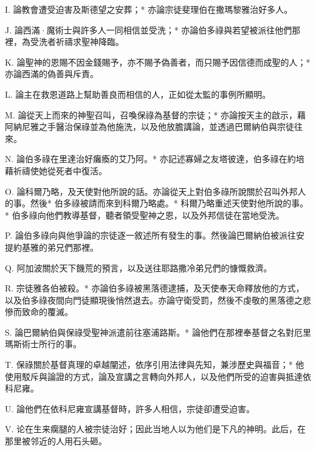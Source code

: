 I. 論教會遭受迫害及斯德望之安葬；* 亦論宗徒斐理伯在撒瑪黎雅治好多人。\par

J. 論西滿·魔術士與許多人一同相信並受洗；* 亦論伯多祿與若望被派往他們那裡，為受洗者祈禱求聖神降臨。\par

K. 論聖神的恩賜不因金錢賜予，亦不賜予偽善者，而只賜予因信德而成聖的人；* 亦論西滿的偽善與斥責。\par

L. 論主在救恩道路上幫助善良而相信的人，正如從太監的事例所顯明。\par

M. 論從天上而來的神聖召叫，召喚保祿為基督的宗徒；* 亦論按天主的啟示，藉阿納尼雅之手醫治保祿並為他施洗，以及他放膽講論，並透過巴爾納伯與宗徒往來。\par

N. 論伯多祿在里達治好癱瘓的艾乃阿。* 亦記述寡婦之友塔彼達，伯多祿在約培藉祈禱使她從死者中復活。\par

O. 論科爾乃略，及天使對他所說的話。亦論從天上對伯多祿所說關於召叫外邦人的事。然後* 伯多祿被請而來到科爾乃略處。* 科爾乃略重述天使對他所說的事。* 伯多祿向他們教導基督，聽者領受聖神之恩，以及外邦信徒在當地受洗。\par

P. 論伯多祿向與他爭論的宗徒逐一敘述所有發生的事。然後論巴爾納伯被派往安提約基雅的弟兄們那裡。\par

Q. 阿加波關於天下饑荒的預言，以及送往耶路撒冷弟兄們的慷慨救濟。\par

R. 宗徒雅各伯被殺。* 亦論伯多祿被黑落德逮捕，及天使奉天命釋放他的方式，以及伯多祿夜間向門徒顯現後悄然退去。亦論守衛受罰，然後不虔敬的黑落德之悲慘而致命的覆滅。\par

S. 論巴爾納伯與保祿受聖神派遣前往塞浦路斯。* 論他們在那裡奉基督之名對厄里瑪斯術士所行的事。\par

T. 保祿關於基督真理的卓越闡述，依序引用法律與先知，兼涉歷史與福音；* 他使用駁斥與論證的方式，論及宣講之言轉向外邦人，以及他們所受的迫害與抵達依科尼雍。\par

U. 論他們在依科尼雍宣講基督時，許多人相信，宗徒卻遭受迫害。\par

V. 论在生来瘸腿的人被宗徒治好；因此当地人以为他们是下凡的神明。此后，在那里被邻近的人用石头砸。\par

